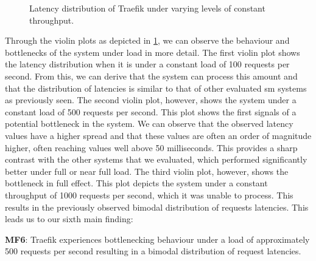 \begin{figure}[t]
    \centering
    
    
    \caption[Experiment 2 - Latency distribution of Traefik under varying levels of constant throughput.]{Latency distribution of Traefik under varying levels of constant throughput.}
    
    \label{fig:exp:02:traefik-bottleneck}
\end{figure}

Through the violin plots as depicted in \cref{fig:exp:02:traefik-bottleneck}, we can observe the behaviour and bottlenecks of the system under load in more detail. The first violin plot shows the latency distribution when it is under a constant load of 100 requests per second. From this, we can derive that the system can process this amount and that the distribution of latencies is similar to that of other evaluated \gls{sm} systems as previously seen. The second violin plot, however, shows the system under a constant load of 500 requests per second. This plot shows the first signals of a potential bottleneck in the system. We can observe that the observed latency values have a higher spread and that these values are often an order of magnitude higher, often reaching values well above 50 milliseconds. This provides a sharp contrast with the other systems that we evaluated, which performed significantly better under full or near full load. The third violin plot, however, shows the bottleneck in full effect. This plot depicts the system under a constant throughput of 1000 requests per second, which it was unable to process. This results in the previously observed bimodal distribution of requests latencies. This leads us to our sixth main finding:


\begin{shaded*}
    \noindent
    \textbf{MF6}: 
    Traefik experiences bottlenecking behaviour under a load of approximately 500 requests per second resulting in a bimodal distribution of request latencies.
\end{shaded*}


